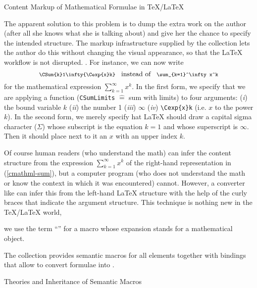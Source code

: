 \begin{omgroup}[id=stex,creators=miko]
\begin{module}[id=content-markup-LaTeX]
\begin{omgroup}{Content Markup of Mathematical Formulae in {\TeX/\LaTeX}}
\begin{omtext}
  The apparent solution to this problem is to dump the extra work on the author (after all
  she knows what she is talking about) and give her the chance to specify the intended
  structure. The markup infrastructure supplied by the {\stex} collection lets the author
  do this without changing the visual appearance, so that the {\LaTeX} workflow is not
  disrupted. . For instance, we can now write
\begin{equation}\label{cmathml-sum}\footnotesize
  \verb|\CSum{k}1\infty{\Cexp{x}k}| \quad\hbox{\normalsize instead of}\quad
  \verb|\sum_{k=1}^\infty x^k|
\end{equation}
for the mathematical expression $\sum_{k=1}^\infty x^k$. In the first form, we specify
that we are applying a function (\verb|CSumLimits| $\hat=$ sum with limits) to four
arguments: ({\sl{i}}) the bound variable $k$ ({\sl{ii}}) the number 1 ({\sl{iii}})
$\infty$ ({\sl{iv}}) \verb|\Cexp{x}k| (i.e. $x$ to the power $k$).  In the second form, we
merely specify hat {\LaTeX} should draw a capital sigma character ($\Sigma$) whose
subscript is the equation $k=1$ and whose superscript is $\infty$. Then it should place
next to it an $x$ with an upper index $k$.
\end{omtext}

Of course human readers (who understand the math) can infer the content structure from the
expression $\sum_{k=1}^\infty x^k$ of the right-hand representation in
(\ref{cmathml-sum}), but a computer program (who does not understand the math or know the
context in which it was encountered) cannot. However, a converter like {\latexml} can
infer this from the left-hand {\LaTeX} structure with the help of the curly braces that
indicate the argument structure. This technique is nothing new in the {\TeX/\LaTeX} world,
\begin{definition}[display=flow]
  we use the term ``{}'' for a macro whose expansion stands for a
  mathematical object.
\end{definition}
The {\stex} collection provides semantic macros for all {\cmathml} elements together with
{\latexml} bindings that allow to convert {\stex} formulae into {\mathml}.
\end{omgroup}
\end{module}
\begin{omgroup}{Theories and Inheritance of Semantic Macros}


\end{omgroup}
\end{omgroup}
